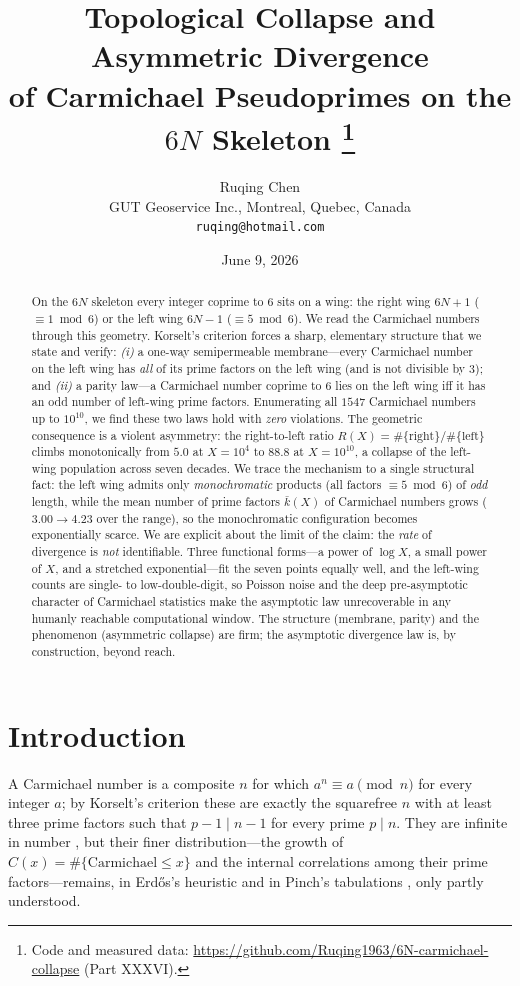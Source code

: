 \documentclass[11pt]{article}
\title{\bf Topological Collapse and Asymmetric Divergence\\
of Carmichael Pseudoprimes on the $6N$ Skeleton%
\thanks{Code and measured data: \url{https://github.com/Ruqing1963/6N-carmichael-collapse} (Part XXXVI).}}
\author{Ruqing Chen\\
\small GUT Geoservice Inc., Montreal, Quebec, Canada\\
\small \texttt{ruqing@hotmail.com}}
\date{June 9, 2026}
\theoremstyle{plain}
\theoremstyle{definition}
\begin{document}
\maketitle

\begin{abstract}
On the $6N$ skeleton every integer coprime to $6$ sits on a wing: the right wing $6N{+}1$
($\equiv1\bmod6$) or the left wing $6N{-}1$ ($\equiv5\bmod6$). We read the Carmichael numbers
through this geometry. Korselt's criterion forces a sharp, elementary structure that we state and
verify: \emph{(i)} a one-way semipermeable membrane---every Carmichael number on the left wing has
\emph{all} of its prime factors on the left wing (and is not divisible by $3$); and \emph{(ii)} a
parity law---a Carmichael number coprime to $6$ lies on the left wing iff it has an odd number of
left-wing prime factors. Enumerating all $1547$ Carmichael numbers up to $10^{10}$, we find these two
laws hold with \emph{zero} violations. The geometric consequence is a violent asymmetry: the
right-to-left ratio $R(X)=\#\{\text{right}\}/\#\{\text{left}\}$ climbs monotonically from $5.0$ at
$X=10^{4}$ to $88.8$ at $X=10^{10}$, a collapse of the left-wing population across seven decades. We
trace the mechanism to a single structural fact: the left wing admits only \emph{monochromatic}
products (all factors $\equiv5\bmod6$) of \emph{odd} length, while the mean number of prime factors
$\bar k(X)$ of Carmichael numbers grows ($3.00\to4.23$ over the range), so the monochromatic
configuration becomes exponentially scarce. We are explicit about the limit of the claim: the
\emph{rate} of divergence is \emph{not} identifiable. Three functional forms---a power of $\log X$, a
small power of $X$, and a stretched exponential---fit the seven points equally well, and the left-wing
counts are single- to low-double-digit, so Poisson noise and the deep pre-asymptotic character of
Carmichael statistics make the asymptotic law unrecoverable in any humanly reachable computational
window. The structure (membrane, parity) and the phenomenon (asymmetric collapse) are firm; the
asymptotic divergence law is, by construction, beyond reach.
\end{abstract}

\section{Introduction}
A Carmichael number is a composite $n$ for which $a^{n}\equiv a\pmod n$ for every integer $a$; by
Korselt's criterion \cite{Korselt} these are exactly the squarefree $n$ with at least three prime
factors such that $p-1\mid n-1$ for every prime $p\mid n$. They are infinite in number
\cite{AGP}, but their finer distribution---the growth of $C(x)=\#\{\text{Carmichael}\le x\}$ and the
internal correlations among their prime factors---remains, in Erd\H{o}s's heuristic \cite{Erdos} and
in Pinch's tabulations \cite{Pinch}, only partly understood.
\end{document}
